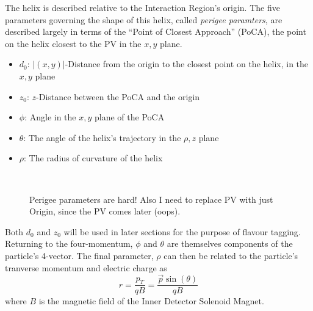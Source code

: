             The helix is described relative to the Interaction Region's origin.
            The five parameters governing the shape of this helix, called \textit{perigee paramters}, 
                are described largely in terms of the ``Point of Closest Approach'' (PoCA),
                the point on the helix closest to the PV in the $x,y$ plane.
            \begin{itemize}
                \item $d_0$: $|(x,y)|$-Distance from the origin to the closest point on the helix, in the $x,y$ plane
                \item $z_0$: $z$-Distance between the PoCA and the origin
                \item $\phi$: Angle in the $x,y$ plane of the PoCA
                \item $\theta$: The angle of the helix's trajectory in the $\rho,z$ plane
                \item $\rho$: The radius of curvature of the helix
            \end{itemize}

            \begin{figure}
                \\
                \caption{
                    Perigee parameters are hard! Also I need to replace PV with just Origin, since the PV comes later (oops).
                }
                \label{fig:perigee_params}
            \end{figure}
            

            Both $d_0$ and $z_0$ will be used in later sections for the purpose of flavour tagging.
            Returning to the four-momentum, $\phi$ and $\theta$ are themselves components of the particle's 4-vector.
            The final parameter, $\rho$ can then be related to the particle's tranverse momentum and electric charge as
            \begin{equation}
            r = \frac{p_T}{qB} = \frac{\vec{p} \sin(\theta)}{qB}
            \end{equation}
            where $B$ is the magnetic field of the Inner Detector Solenoid Magnet.
            \cite{thesis_track_sim_and_reco}

